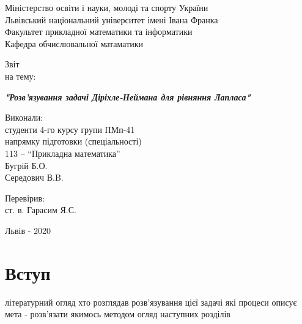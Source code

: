 \documentclass[14pt,a4paper]{extarticle}
\newcounter{e}
\newcounter{tabl}
\begin{document}
	
	
	
	\thispagestyle{empty}
	
	\begin{center}
		\large
		Міністерство освіти і науки, молоді та спорту України \\
		Львівський національний університет імені Івана Франка \\
		Факультет прикладної математики та інформатики \\
		Кафедра обчислювальної матаматики
	\end{center}
	
	\vspace{45pt}
	
	\vfill
	
	\begin{center}
		{\Huge{Звіт}}\\
		{\large на тему:}
	\end{center}
	
	\begin{center}\Large
		\textbf{\emph{"Розв'язування задачі Діріхле-Неймана для рівняння Лапласа"}}
	\end{center}
	
	\vfill
	\vskip100pt
	
	\begin{flushleft}
		\hskip8cm 
		Виконали:
		\\ \hskip8cm 
		студенти 4-го курсу групи ПМп-41
		\\ \hskip8cm
		напрямку підготовки (спеціальності)
		\\ \hskip8cm
		113 -- ``Прикладна математика''
		\\ \hskip8cm
		Бугрій Б.О.
		\\ \hskip8cm
		Середович В.B.
	\end{flushleft}
	
	\begin{flushleft}
		\hskip8cm 
		Перевірив:
		\\ \hskip8cm
		ст. в. Гарасим Я.С.
	\end{flushleft}
	
	\vfill
	
	\begin{center}
		\large
		Львів - 2020
	\end{center}
	
	\newpage
	\thispagestyle{empty}
	\tableofcontents
	
	\newpage
	\thispagestyle{empty}
	\section*{Вступ}
	\begin{center}\end{center}
	літературний огляд
	хто розглядав розв'язування цієї задачі
	які процеси описує
	мета - розв'язати якимось методом
	огляд наступних розділів
	
\end{document}

